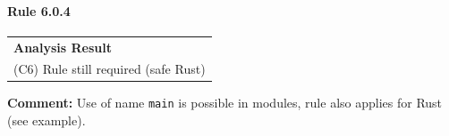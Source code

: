 \paragraph{Rule 6.0.4}
\begin{longtable}{p{13cm}}
\textbf{Analysis Result} \\
(C6) Rule still required (safe Rust) \\
\end{longtable}
\textbf{Comment:} Use of name \texttt{main} is possible in modules, rule also applies for Rust (see example). \\


